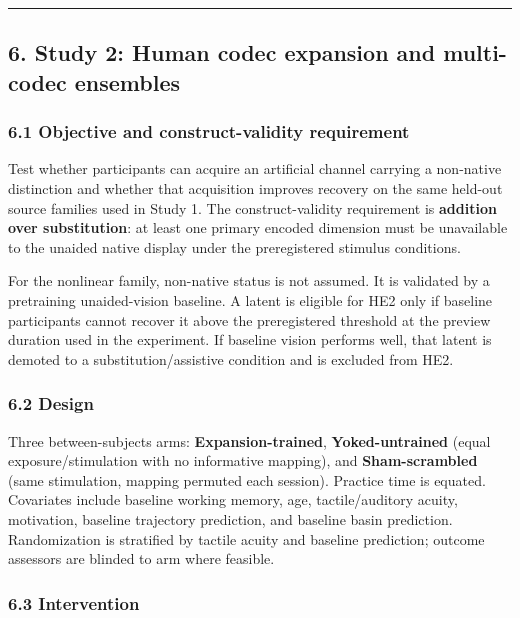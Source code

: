 \documentclass[
  11pt,
]{article}
\begin{document}
\begin{center}\rule{0.5\linewidth}{0.5pt}\end{center}

\subsection{6. Study 2: Human codec expansion
and multi-codec
ensembles}\label{study-2-human-codec-expansion-and-multi-codec-ensembles}

\subsubsection{6.1 Objective and
construct-validity
requirement}\label{objective-and-construct-validity-requirement}

Test whether participants can acquire an
artificial channel carrying a non-native
distinction and whether that acquisition
improves recovery on the same held-out source
families used in Study 1. The construct-validity
requirement is \textbf{addition over
substitution}: at least one primary encoded
dimension must be unavailable to the unaided
native display under the preregistered stimulus
conditions.

For the nonlinear family, non-native status is
not assumed. It is validated by a pretraining
unaided-vision baseline. A latent is eligible
for HE2 only if baseline participants cannot
recover it above the preregistered threshold at
the preview duration used in the experiment. If
baseline vision performs well, that latent is
demoted to a substitution/assistive condition
and is excluded from HE2.

\subsubsection{6.2 Design}\label{design}

Three between-subjects arms:
\textbf{Expansion-trained},
\textbf{Yoked-untrained} (equal
exposure/stimulation with no informative
mapping), and \textbf{Sham-scrambled} (same
stimulation, mapping permuted each session).
Practice time is equated. Covariates include
baseline working memory, age, tactile/auditory
acuity, motivation, baseline trajectory
prediction, and baseline basin prediction.
Randomization is stratified by tactile acuity
and baseline prediction; outcome assessors are
blinded to arm where feasible.

\subsubsection{6.3
Intervention}\label{intervention}
\end{document}
